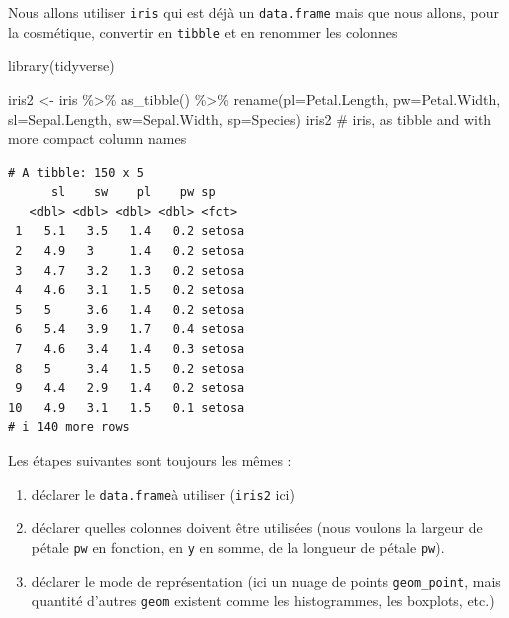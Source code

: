 \documentclass[
  letterpaper,
  DIV=11,
  numbers=noendperiod]{scrreprt}
\newenvironment{Shaded}{\begin{snugshade}}{\end{snugshade}}
\newcommand{\AttributeTok}[1]{\textcolor[rgb]{0.40,0.45,0.13}{#1}}
\newcommand{\CommentTok}[1]{\textcolor[rgb]{0.37,0.37,0.37}{#1}}
\newcommand{\FunctionTok}[1]{\textcolor[rgb]{0.28,0.35,0.67}{#1}}
\newcommand{\NormalTok}[1]{\textcolor[rgb]{0.00,0.23,0.31}{#1}}
\newcommand{\OtherTok}[1]{\textcolor[rgb]{0.00,0.23,0.31}{#1}}
\newcommand{\SpecialCharTok}[1]{\textcolor[rgb]{0.37,0.37,0.37}{#1}}
\providecommand{\tightlist}{%
  \setlength{\itemsep}{0pt}\setlength{\parskip}{0pt}}\usepackage{longtable,booktabs,array}
\begin{document}
Nous allons utiliser \texttt{iris} qui est déjà un \texttt{data.frame}
mais que nous allons, pour la cosmétique, convertir en \texttt{tibble}
et en renommer les colonnes

\begin{Shaded}
\begin{Highlighting}[]
\FunctionTok{library}\NormalTok{(tidyverse)}
\end{Highlighting}
\end{Shaded}

\begin{Shaded}
\begin{Highlighting}[]
\NormalTok{iris2 }\OtherTok{\textless{}{-}}\NormalTok{ iris }\SpecialCharTok{\%\textgreater{}\%} 
  \FunctionTok{as\_tibble}\NormalTok{() }\SpecialCharTok{\%\textgreater{}\%} 
  \FunctionTok{rename}\NormalTok{(}\AttributeTok{pl=}\NormalTok{Petal.Length, }\AttributeTok{pw=}\NormalTok{Petal.Width,}
         \AttributeTok{sl=}\NormalTok{Sepal.Length, }\AttributeTok{sw=}\NormalTok{Sepal.Width, }\AttributeTok{sp=}\NormalTok{Species)}
\NormalTok{iris2 }\CommentTok{\# iris, as tibble and with more compact column names}
\end{Highlighting}
\end{Shaded}

\begin{verbatim}
# A tibble: 150 x 5
      sl    sw    pl    pw sp    
   <dbl> <dbl> <dbl> <dbl> <fct> 
 1   5.1   3.5   1.4   0.2 setosa
 2   4.9   3     1.4   0.2 setosa
 3   4.7   3.2   1.3   0.2 setosa
 4   4.6   3.1   1.5   0.2 setosa
 5   5     3.6   1.4   0.2 setosa
 6   5.4   3.9   1.7   0.4 setosa
 7   4.6   3.4   1.4   0.3 setosa
 8   5     3.4   1.5   0.2 setosa
 9   4.4   2.9   1.4   0.2 setosa
10   4.9   3.1   1.5   0.1 setosa
# i 140 more rows
\end{verbatim}

Les étapes suivantes sont toujours les mêmes :

\begin{enumerate}
\def\labelenumi{\arabic{enumi}.}
\tightlist
\item
  déclarer le \texttt{data.frame}à utiliser (\texttt{iris2} ici)
\item
  déclarer quelles colonnes doivent être utilisées (nous voulons la
  largeur de pétale \texttt{pw} en fonction, en \texttt{y} en somme, de
  la longueur de pétale \texttt{pw}).
\item
  déclarer le mode de représentation (ici un nuage de points
  \texttt{geom\_point}, mais quantité d'autres \texttt{geom} existent
  comme les histogrammes, les boxplots, etc.)
\end{enumerate}
\end{document}
